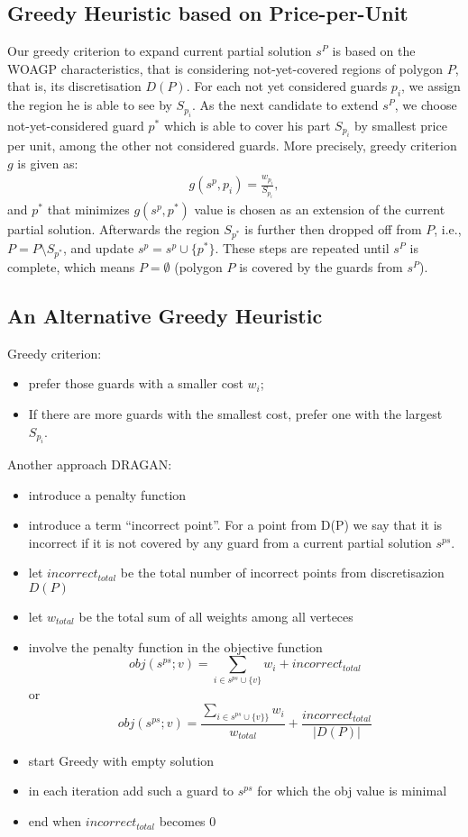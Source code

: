 \documentclass[runningheads,a4paper]{llncs}
\begin{document}
      \subsection{Greedy Heuristic based on Price-per-Unit}
       Our greedy criterion to expand current partial solution $s^P$  is based on the WOAGP characteristics, that is considering not-yet-covered regions of polygon $P$, that is, its discretisation $D(P)$. For each not yet considered guards $p_i$, we assign the region he is able to see by $S_{p_i}$. As the next candidate to extend $s^P$, we choose not-yet-considered guard $p^*$ which is able to cover his part $S_{p_i}$ by smallest price per unit, among the other not considered guards. More precisely, greedy criterion $g$ is given as:
       \begin{align}
            g(s^p, p_i) = \frac{w_{p_i}}{S_{p_i}},
       \end{align}
       and $p^*$ that minimizes $g(s^p, p^*)$ value is chosen as an extension of the current partial solution.
       Afterwards the region $S_{p^*}$ is further then dropped off from $P$, i.e., $P=P \setminus S_{p^*}$, and update $s^p= s^p \cup \{p^*\}$.  These steps are repeated until $s^P$ is complete, which means $P = \emptyset$ (polygon $P$ is covered by the guards from $s^P$).  
        \subsection{An Alternative Greedy Heuristic}
         Greedy criterion: 
          \begin{itemize}
          	\item prefer those guards with a smaller cost $w_i$; 
          	\item If there are more guards with the smallest cost, 
          	prefer one with the largest $S_{p_i}$.
          \end{itemize}
		 Another approach DRAGAN:
           \begin{itemize}
			\item introduce a penalty function
          	\item introduce a term ``incorrect point''. For a point from D(P) we say that it is incorrect if it is not covered by any guard from a current partial solution $s^{ps}$.
			\item let $incorrect_{total}$ be the total number of incorrect points from discretisazion $D(P)$
			\item let $w_{total}$ be the total sum of all weights among all verteces
			\item involve the penalty function in the objective function
				$$obj(s^{ps}; v)  = \sum_{i \in s^{ps} \cup \{v\}} w_i+ incorrect_{total}$$ or
				$$obj(s^{ps}; v) = \frac{\sum_{i \in s^{ps} \cup \{v\}\}} w_i}{w_{total}}+ \frac{incorrect_{total}}{|D(P)|}$$
			\item start Greedy with empty solution
			\item in each iteration add such a guard to $s^{ps}$ for which the obj value is minimal
			\item end when $incorrect_{total}$ becomes 0
          \end{itemize}
\end{document}
